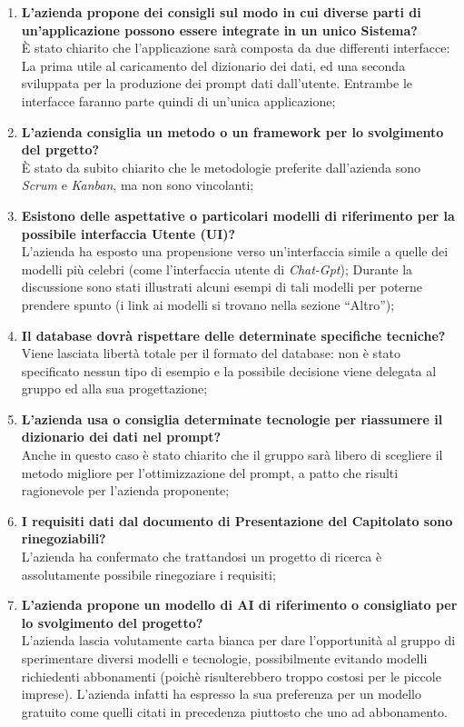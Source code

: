 \documentclass{article}
\begin{document}
\begin{paracol}{2}
\switchcolumn
\begin{enumerate}
    \item 
    \textbf{L’azienda propone dei consigli sul modo in cui diverse parti di un'applicazione possono essere integrate in un unico Sistema?\\} È stato chiarito che l’applicazione sarà composta da due differenti interfacce: La prima utile al caricamento del dizionario dei dati, ed una seconda sviluppata per la produzione dei prompt dati dall’utente. Entrambe le interfacce faranno parte quindi di un'unica applicazione;
    \item \textbf{L'azienda consiglia un metodo o un framework per lo svolgimento del prgetto?\\} È stato da subito chiarito che le metodologie preferite dall’azienda sono \textit{Scrum} e \textit{Kanban}, ma non sono vincolanti; 
    \item \textbf{Esistono delle aspettative o particolari modelli di riferimento per la possibile interfaccia Utente (UI)?\\}L’azienda ha esposto una propensione verso un’interfaccia simile a quelle dei modelli più celebri (come l’interfaccia utente di \textit{Chat-Gpt}); Durante la discussione sono stati illustrati alcuni esempi di tali modelli per poterne prendere spunto (i link ai modelli si trovano nella sezione “Altro”);
    \item \textbf{Il database dovrà rispettare delle determinate specifiche tecniche?\\}Viene lasciata libertà totale per il formato del database: non è stato specificato nessun tipo di esempio e la possibile decisione viene delegata al gruppo ed alla sua progettazione;
    \item \textbf{L’azienda usa o consiglia determinate tecnologie per riassumere il dizionario dei dati nel prompt?\\} Anche in questo caso è stato chiarito che il gruppo sarà libero di scegliere il metodo migliore per l'ottimizzazione del prompt, a patto che risulti ragionevole per l'azienda proponente;
    \item \textbf{I requisiti dati dal documento di Presentazione del Capitolato sono rinegoziabili?\\} L’azienda ha confermato che trattandosi un progetto di ricerca è assolutamente possibile rinegoziare i requisiti;
    \item \textbf{L’azienda propone un modello di AI di riferimento o consigliato per lo svolgimento del progetto?\\} L’azienda lascia volutamente carta bianca per dare l’opportunità al gruppo di sperimentare diversi modelli e tecnologie, possibilmente evitando modelli richiedenti abbonamenti (poichè risulterebbero troppo costosi per le piccole imprese). L’azienda infatti ha espresso la sua preferenza per un modello gratuito come quelli citati in precedenza piuttosto che uno ad abbonamento.
    







\end{enumerate}
\end{paracol}
\end{document}
